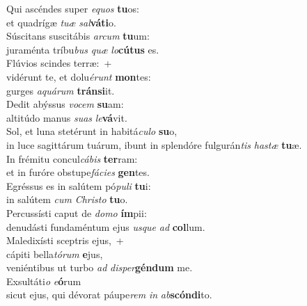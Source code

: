 \oddverse Qui ascéndes super \textit{e}\textit{quos} \textbf{tu}os:~\*\\
\oddverse et quadrígæ \textit{tu}\textit{æ} \textit{sal}\textbf{vá}\textbf{ti}o.\\
\evenverse Súscitans suscitábis \textit{ar}\textit{cum} \textbf{tu}um:~\*\\
\evenverse juraménta tríbu\textit{bus} \textit{quæ} \textit{lo}\textbf{cú}\textbf{tus} es.\\
\oddverse Flúvios scindes terræ:~+\\
\oddverse  vidérunt te, et dolu\textit{é}\textit{runt} \textbf{mon}tes:~\*\\
\oddverse gurges \textit{a}\textit{quá}\textit{rum} \textbf{trán}\textbf{si}it.\\
\evenverse Dedit abýssus \textit{vo}\textit{cem} \textbf{su}am:~\*\\
\evenverse altitúdo manus \textit{su}\textit{as} \textit{le}\textbf{vá}vit.\\
\oddverse Sol, et luna stetérunt in habitá\textit{cu}\textit{lo} \textbf{su}o,~\*\\
\oddverse in luce sagittárum tuárum, ibunt in splendóre fulgurán\textit{tis} \textit{ha}\textit{stæ} \textbf{tu}æ.\\
\evenverse In frémitu concul\textit{cá}\textit{bis} \textbf{ter}ram:~\*\\
\evenverse et in furóre obstupe\textit{fá}\textit{ci}\textit{es} \textbf{gen}tes.\\
\oddverse Egréssus es in salútem pó\textit{pu}\textit{li} \textbf{tu}i:~\*\\
\oddverse in salútem \textit{cum} \textit{Chri}\textit{sto} \textbf{tu}o.\\
\evenverse Percussísti caput de \textit{do}\textit{mo} \textbf{ím}pii:~\*\\
\evenverse denudásti fundaméntum ejus \textit{us}\textit{que} \textit{ad} \textbf{col}lum.\\
\oddverse Maledixísti sceptris ejus,~+\\
\oddverse  cápiti bella\textit{tó}\textit{rum} \textbf{e}jus,~\*\\
\oddverse veniéntibus ut turbo \textit{ad} \textit{di}\textit{sper}\textbf{gén}\textbf{dum} me.\\
\evenverse Exsultáti\textit{o} \textit{e}\textbf{ó}rum~\*\\
\evenverse sicut ejus, qui dévorat páupe\textit{rem} \textit{in} \textit{ab}\textbf{scón}\textbf{di}to.\\
